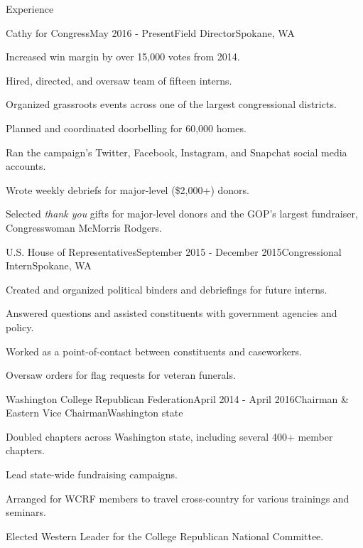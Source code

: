 \documentclass{resume} %
\begin{document}
\begin{rSection}{Experience}

\begin{rSubsection}{Cathy for Congress}{May 2016 - Present}{Field Director}{Spokane, WA}
\item Increased win margin by over 15,000 votes from 2014.
\item Hired, directed, and oversaw team of fifteen interns.
\item Organized grassroots events across one of the largest congressional districts.
\item Planned and coordinated doorbelling for 60,000 homes.
\item Ran the campaign's Twitter, Facebook, Instagram, and Snapchat social media accounts.
\item Wrote weekly debriefs for major-level (\$2,000+) donors.
\item Selected \textit{thank you} gifts for major-level donors and the GOP's largest fundraiser, Congresswoman McMorris Rodgers.
\end{rSubsection}


\begin{rSubsection}{U.S. House of Representatives}{September 2015 - December 2015}{Congressional Intern}{Spokane, WA}
\item Created and organized political binders and debriefings for future interns.
\item Answered questions and assisted constituents with government agencies and policy.
\item Worked as a point-of-contact between constituents and caseworkers.
\item Oversaw orders for flag requests for veteran funerals.
\end{rSubsection}


\begin{rSubsection}{Washington College Republican Federation}{April 2014 - April 2016}{Chairman \& Eastern Vice Chairman}{Washington state}
\item Doubled chapters across Washington state, including several 400+ member chapters.
\item Lead state-wide fundraising campaigns.
\item Arranged for WCRF members to travel cross-country for various trainings and seminars.
\item Elected Western Leader for the College Republican National Committee.
\end{rSubsection}

\end{rSection}
\end{document}
